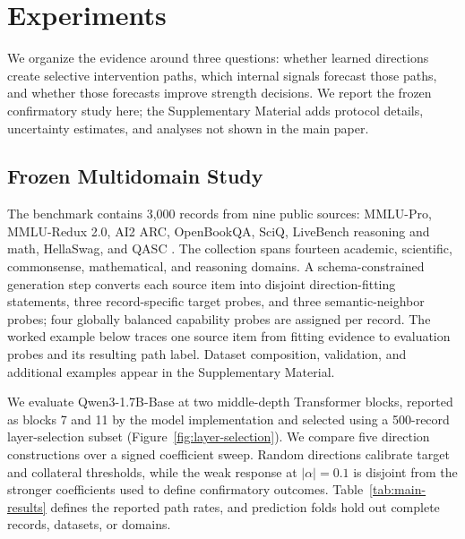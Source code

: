 \section{Experiments}

We organize the evidence around three questions: whether learned directions
create selective intervention paths, which internal signals forecast those
paths, and whether those forecasts improve strength decisions. We report the
frozen confirmatory study here; the Supplementary Material adds protocol
details, uncertainty estimates, and analyses not shown in the main paper.

\subsection{Frozen Multidomain Study}

The benchmark contains 3,000 records from nine public sources: MMLU-Pro,
MMLU-Redux 2.0, AI2 ARC, OpenBookQA, SciQ, LiveBench reasoning and math,
HellaSwag, and QASC
\citep{wang2024mmlupro,gema2024mmluredux,clark2018arc,
mihaylov-etal-2018-suit,welbl-etal-2017-crowdsourcing,white2025livebench,
zellers-etal-2019-hellaswag,khot2020qasc}. The collection spans fourteen
academic, scientific, commonsense, mathematical, and reasoning domains. A
schema-constrained generation step converts each source item into disjoint
direction-fitting statements, three record-specific target probes, and three
semantic-neighbor probes; four globally balanced capability probes are assigned
per record. The worked example below traces one source item from fitting
evidence to evaluation probes and its resulting path label. Dataset composition,
validation, and additional examples appear in the Supplementary Material.



We evaluate Qwen3-1.7B-Base \citep{yang2025qwen3} at two middle-depth
Transformer blocks, reported as blocks 7 and 11 by the model implementation and
selected using a 500-record layer-selection subset
(Figure~\ref{fig:layer-selection}). We
compare five direction constructions over a signed coefficient sweep. Random
directions calibrate target and collateral thresholds, while the weak response
at $|\alpha|=0.1$ is disjoint from the stronger coefficients used to define
confirmatory outcomes. Table~\ref{tab:main-results} defines the reported path
rates, and prediction folds hold out complete records, datasets, or domains.

